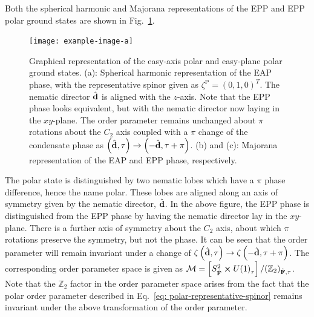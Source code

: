 Both the spherical harmonic and Majorana representations of the EPP and EPP
polar ground states are shown in Fig.~\ref{fig: spin-1-polar-graph}.
\begin{figure}
    \centering
    \texttt{[image: example-image-a]}
    \caption[Graphical representations of the spin-1 easy-axis polar and
    easy-plane polar ground states]{\label{fig: spin-1-polar-graph}Graphical
    representation of the easy-axis polar and easy-plane polar ground states.
    (a): Spherical harmonic representation of the EAP phase, with the
    representative spinor given as \(\zeta^\mathrm{P}={(0, 1, 0)}^T\).
    The nematic director \(\hat{\vb{d}}\) is aligned with the \(z\)-axis.
    Note that the EPP phase looks equivalent, but with the nematic director
    now laying in the \(xy\)-plane.
    The order parameter remains unchanged about \(\pi \) rotations about the
    \(C_2\) axis coupled with a \(\pi \) change of the condensate phase as
    \(\left(\hat{\vb{d}}, \tau\right) \rightarrow
    \left(-\hat{\vb{d}}, \tau+\pi\right)\).
    (b) and (c): Majorana representation of the EAP and EPP phase,
    respectively.}
\end{figure}
The polar state is distinguished by two nematic lobes which have a \(\pi \)
phase difference, hence the name polar.
These lobes are aligned along an axis of symmetry given by the nematic director,
\(\hat{\vb{d}}\).
In the above figure, the EPP phase is distinguished from the EPP phase by having
the nematic director lay in the \(xy\)-plane.
There is a further axis of symmetry about the \(C_2\) axis, about which \(\pi \)
rotations preserve the symmetry, but not the phase.
It can be seen that the order parameter will remain invariant under a change of
\(\zeta\left(\hat{\vb{d}}, \tau\right) \rightarrow
\zeta\left(-\hat{\vb{d}}, \tau + \pi\right)\).
The corresponding order parameter space is given as \(\mathcal{M} =
\left[S^2_{\hat{\vb{F}}} \cross {U(1)}_\tau\right] /
{({\mathbb{Z}}_2)}_{\hat{\vb{F}}, \tau} \).
Note that the \(\mathbb{Z}_2\) factor in the order parameter space arises from
the fact that the polar order parameter described in
Eq.~\eqref{eq: polar-representative-spinor} remains invariant under the
above transformation of the order parameter.

